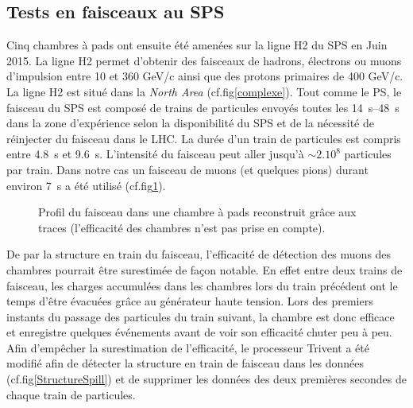 \subsection{Tests en faisceaux au SPS} 
Cinq chambres à pads ont ensuite été amenées sur la ligne H2 \cite{H2line} du SPS en Juin 2015. La ligne H2 permet d'obtenir des faisceaux de hadrons, électrons ou muons d'impulsion entre 10 et 360 GeV/c ainsi que des protons primaires de 400 GeV/c. La ligne H2 est situé dans la \textit{North Area} (cf.fig\ref{complexe}). Tout comme le PS, le faisceau du SPS est composé de trains de particules envoyés toutes les \SIrange{14}{48}{\second} dans la zone d’expérience selon la disponibilité du SPS et de la nécessité de réinjecter du faisceau dans le LHC. La durée d’un train de particules est compris entre \SI{4.8}{\second} et \SI{9.6}{\second}. L'intensité du faisceau peut aller jusqu'à $\sim 2.10^{8}$ particules par train. Dans notre cas un faisceau de muons (et quelques pions) durant environ \SI{7}{\second} a été utilisé (cf.fig\ref{ProfilFaisceauSPS}).

\begin{figure}[ht!]
	\centering
	\hfill
	\caption{Profil du faisceau dans une chambre à pads reconstruit grâce aux traces (l’efficacité des chambres n’est pas prise en compte).}
	\label{ProfilFaisceauSPS}
\end{figure}

De par la structure en train du faisceau, l'efficacité de détection des muons des chambres pourrait être surestimée de façon notable. En effet entre deux trains de faisceau, les charges accumulées dans les chambres lors du train précédent ont le temps d'être évacuées grâce au générateur haute tension. Lors des premiers instants du passage des particules du train suivant, la chambre est donc efficace et enregistre quelques événements avant de voir son efficacité chuter peu à peu. Afin d'empêcher la surestimation de l'efficacité, le processeur Trivent a été modifié afin de détecter la structure en train de faisceau dans les données (cf.fig\ref{StructureSpill}) et de supprimer les données des deux premières secondes de chaque train de particules.

